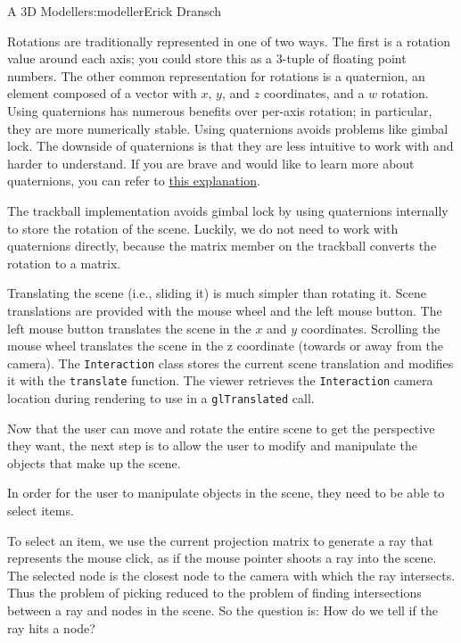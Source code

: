 \begin{aosachapter}{A 3D Modeller}{s:modeller}{Erick Dransch}
\label{aside-quaternions}

Rotations are traditionally represented in one of two ways. The first is
a rotation value around each axis; you could store this as a 3-tuple of
floating point numbers. The other common representation for rotations is
a quaternion, an element composed of a vector with $x$, $y$, and $z$
coordinates, and a $w$ rotation. Using quaternions has numerous benefits
over per-axis rotation; in particular, they are more numerically stable.
Using quaternions avoids problems like gimbal lock. The downside of
quaternions is that they are less intuitive to work with and harder to
understand. If you are brave and would like to learn more about
quaternions, you can refer to \href{http://3dgep.com/?p=1815}{this
explanation}.

The trackball implementation avoids gimbal lock by using quaternions
internally to store the rotation of the scene. Luckily, we do not need
to work with quaternions directly, because the matrix member on the
trackball converts the rotation to a matrix.

\label{translating-the-scene}

Translating the scene (i.e., sliding it) is much simpler than rotating
it. Scene translations are provided with the mouse wheel and the left
mouse button. The left mouse button translates the scene in the $x$ and
$y$ coordinates. Scrolling the mouse wheel translates the scene in the z
coordinate (towards or away from the camera). The \texttt{Interaction}
class stores the current scene translation and modifies it with the
\texttt{translate} function. The viewer retrieves the
\texttt{Interaction} camera location during rendering to use in a
\texttt{glTranslated} call.

\label{selecting-scene-objects}

Now that the user can move and rotate the entire scene to get the
perspective they want, the next step is to allow the user to modify and
manipulate the objects that make up the scene.

In order for the user to manipulate objects in the scene, they need to
be able to select items.

To select an item, we use the current projection matrix to generate a
ray that represents the mouse click, as if the mouse pointer shoots a
ray into the scene. The selected node is the closest node to the camera
with which the ray intersects. Thus the problem of picking reduced to
the problem of finding intersections between a ray and nodes in the
scene. So the question is: How do we tell if the ray hits a node?


\end{aosachapter}
